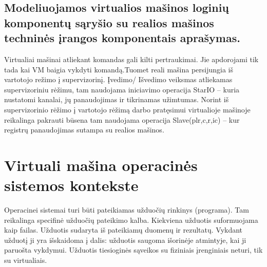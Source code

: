 \documentclass[oneside]{VUMIFPSkursinis}
\begin{document}
	\subsection{Modeliuojamos virtualios mašinos loginių komponentų sąryšio su realios mašinos techninės įrangos komponentais aprašymas.}
	Virtualiai mašinai atliekant komandas gali kilti pertraukimai. Jie apdorojami tik tada kai VM
baigia vykdyti komandą.Tuomet reali mašina persijungia iš vartotojo režimo į supervizorinį.\newline
Įvedimo/ Išvedimo veiksmas atliekamas supervizoriniu rėžimu, tam naudojama iniciavimo
operacija StarIO – kuria nustatomi kanalai, jų panaudojimas ir tikrinamas užimtumas.\newline
Norint iš supervizorinio rėžimo į vartotojo rėžimą darbo pratęsimui virtualioje mašinoje
reikalinga pakrauti būsena tam naudojama operacija Slave(plr,c,r,ic) – kur registrų panaudojimas
sutampa su realios mašinos.
	\section{Virtuali mašina operacinės sistemos kontekste}
	Operacinei sistemai turi būti pateikiamas užduočių rinkinys (programa). Tam reikalinga specifinė užduočių pateikimo kalba. Kiekviena užduotis suformuojama kaip failas. Užduotis sudaryta iš pateikiamų duomenų ir rezultatų. Vykdant užduotį ji yra išskaidoma į dalis: užduotis saugoma išorinėje atmintyje, kai ji paruošta vykdymui. Užduotis tiesioginės sąveikos su fiziniais įrenginiais neturi, tik su virtualiais.
\end{document}
